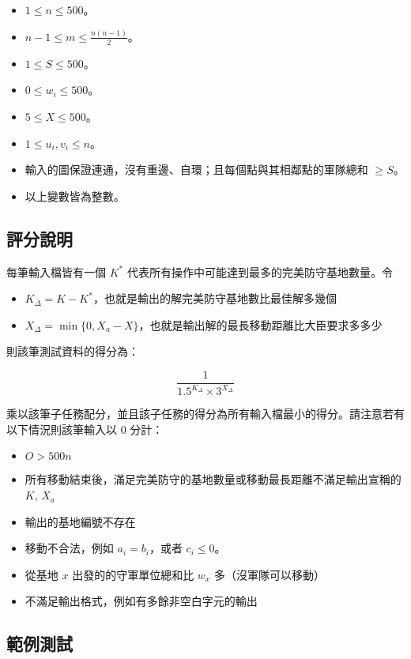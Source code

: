 \begin{itemize}
\tightlist
\item
  \(1 \le n \le 500\)。
\item
  \(n-1 \le m \le \frac{n(n-1)}{2}\)。
\item
  \(1 \le S \le 500\)。
\item
  \(0 \le w_i \le 500\)。
\item
  \(5 \le X \le 500\)。
\item
  \(1 \le u_i, v_i \le n\)。
\item
  輸入的圖保證連通，沒有重邊、自環；且每個點與其相鄰點的軍隊總和
  \(\ge S\)。
\item
  以上變數皆為整數。
\end{itemize}

\subsection{評分說明}

每筆輸入檔皆有一個 \(K^{*}\)
代表所有操作中可能達到最多的完美防守基地數量。令

\begin{itemize}
\tightlist
\item
  \(K_{\Delta} = K - K^{*}\)，也就是輸出的解完美防守基地數比最佳解多幾個
\item
  \(X_{\Delta} = \min\{0, X_a - X\}\)，也就是輸出解的最長移動距離比大臣要求多多少
\end{itemize}

則該筆測試資料的得分為：

\[\frac{1}{1.5^{K_{\Delta}} \times 3^{X_{\Delta}}}\]

乘以該筆子任務配分，並且該子任務的得分為所有輸入檔最小的得分。請注意若有以下情況則該筆輸入以
\(0\) 分計：

\begin{itemize}
\tightlist
\item
  \(O > 500n\)
\item
  所有移動結束後，滿足完美防守的基地數量或移動最長距離不滿足輸出宣稱的
  \(K\), \(X_a\)
\item
  輸出的基地編號不存在
\item
  移動不合法，例如 \(a_i = b_i\)，或者 \(c_i \le 0\)。
\item
  從基地 \(x\) 出發的的守軍單位總和比 \(w_x\) 多（沒軍隊可以移動）
\item
  不滿足輸出格式，例如有多餘非空白字元的輸出
\end{itemize}

\subsection{範例測試}

